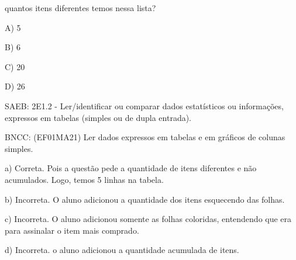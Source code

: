 quantos itens diferentes temos nessa lista?

A) 5

B) 6

C) 20

D) 26

SAEB: 2E1.2 - Ler/identificar ou comparar dados estatísticos ou
informações, expressos em tabelas (simples ou de dupla entrada).

BNCC: (EF01MA21) Ler dados expressos em tabelas e em gráficos de colunas
simples.

a) Correta. Pois a questão pede a quantidade de itens diferentes e não
acumulados. Logo, temos 5 linhas na tabela.

b) Incorreta. O aluno adicionou a quantidade dos itens esquecendo das
folhas.

c) Incorreta. O aluno adicionou somente as folhas coloridas, entendendo
que era para assinalar o item mais comprado.

d) Incorreta. o aluno adicionou a quantidade acumulada de itens.
